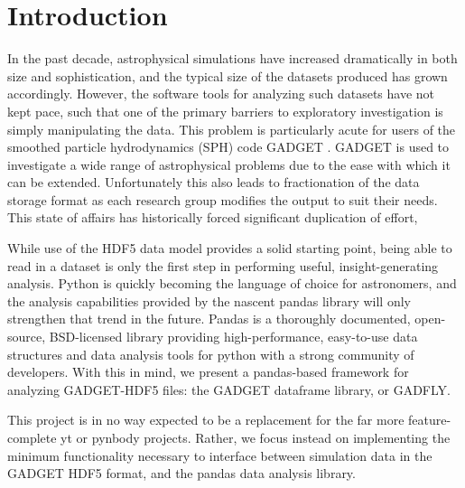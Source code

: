 \section{Introduction}
\label{intro}

In the past decade, astrophysical simulations have increased dramatically in both size and sophistication, and the typical size of the datasets produced has grown accordingly.  
However, the software tools for analyzing such datasets have not kept pace, such that one of the primary barriers to exploratory investigation is simply manipulating the data.  
This problem is particularly acute for users of the smoothed particle hydrodynamics (SPH) code GADGET \citep{SpringelYoshidaWhite2001, Springel2005}.  
GADGET is used to investigate a wide range of astrophysical problems due to the ease with which it can be extended.  
Unfortunately this also leads to fractionation of the data storage format as each research group modifies the output to suit their needs.
This state of affairs has historically forced significant duplication of effort, 


While use of the HDF5 data model provides a solid starting point, being able to read in a dataset is only the first step in performing useful, insight-generating analysis.  Python is quickly becoming the language of choice for astronomers, and the analysis capabilities provided by the nascent pandas library will only strengthen that trend in the future.  Pandas is a thoroughly documented, open-source, BSD-licensed library providing high-performance, easy-to-use data structures and data analysis tools for python with a strong community of developers. With this in mind, we present a pandas-based framework for analyzing GADGET-HDF5 files: the GADGET dataframe library, or GADFLY.

This project is in no way expected to be a replacement for the far more feature-complete yt or pynbody projects. Rather, we focus instead on implementing the minimum functionality necessary to interface between simulation data in the GADGET HDF5 format, and the pandas data analysis library.